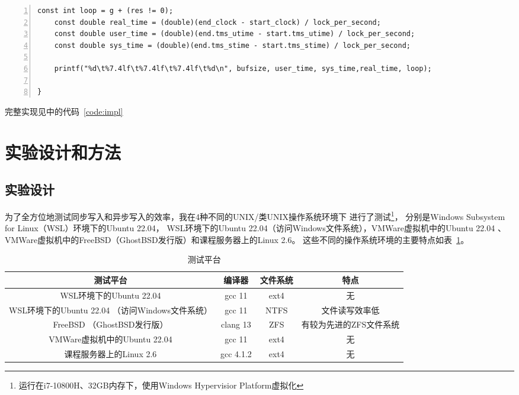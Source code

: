 \documentclass[a4paper,twoside]{article}
\begin{document}
\begin{spacing}{1.2}
\begin{lstlisting}[numbers=left,style=CppStyle,caption=程序关键部分,label={code:impl_key}]
    const int loop = g + (res != 0);
    const double real_time = (double)(end_clock - start_clock) / lock_per_second;
    const double user_time = (double)(end.tms_utime - start.tms_utime) / lock_per_second;
    const double sys_time = (double)(end.tms_stime - start.tms_stime) / lock_per_second;

    printf("%d\t%7.4lf\t%7.4lf\t%7.4lf\t%d\n", bufsize, user_time, sys_time,real_time, loop);

}
\end{lstlisting}

完整实现见中的代码~\ref{code:impl}

\section{实验设计和方法}

\subsection{实验设计}

为了全方位地测试同步写入和异步写入的效率，我在4种不同的UNIX/类UNIX操作系统环境下
进行了测试\footnote{运行在i7-10800H、32GB内存下，使用Windows Hypervisior Platform虚拟化}，
分别是Windows Subsystem for Linux（WSL）环境下的Ubuntu 22.04，
WSL环境下的Ubuntu 22.04（访问Windows文件系统），VMWare虚拟机中的Ubuntu 22.04
、VMWare虚拟机中的FreeBSD（GhostBSD发行版）和课程服务器上的Linux 2.6。
这些不同的操作系统环境的主要特点如表~\ref{tbl:oss}。

\begin{table}[htbp]
	\centering
	\caption{测试平台}
	\label{tbl:oss}
	\begin{tabular}{c|c|c|c}
		\toprule
		\hline
		测试平台 & 编译器 & 文件系统 & 特点  \\
		\hline
		WSL环境下的Ubuntu 22.04 & gcc 11 & ext4 & 无 \\
		\hline
		WSL环境下的Ubuntu 22.04 （访问Windows文件系统） & gcc 11 & NTFS & 文件读写效率低\cite{githubwsl2Filesystem} \\
		\hline
		FreeBSD （GhostBSD发行版） & clang 13 & ZFS & 有较为先进的ZFS文件系统\cite{rodeh2003zfs} \\
		\hline
		VMWare虚拟机中的Ubuntu 22.04 & gcc 11 & ext4 & 无  \\
		\hline
		课程服务器上的Linux 2.6 & gcc 4.1.2 & ext4 & 无  \\
		\hline
		\bottomrule
	\end{tabular}
\end{table}


\end{spacing}
\end{document}
